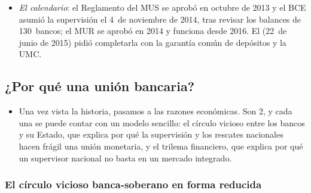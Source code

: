 \documentclass[11pt]{article}
\begin{document}
\begin{itemize}
\begin{itemize}
  \item un mes después, el «haré lo que sea necesario» de  (26~de julio) y las operaciones monetarias de compraventa (OMT) calmaron la deuda; la unión bancaria era la parte estructural de la respuesta\nocite{Draghi2012Speech,BCE2012OMT} .
  \end{itemize}
\item \emph{El calendario}: el Reglamento del MUS se aprobó en octubre de 2013 y el BCE asumió la supervisión el 4~de noviembre de 2014, tras revisar los balances de 130~bancos; el MUR se aprobó en 2014 y funciona desde 2016. El  (22~de junio de 2015) pidió completarla con la garantía común de depósitos y la UMC\nocite{RegUE2013MUS,RegUE2014MUR,Juncker2015CincoPresidentes}.
\end{itemize}

\begin{infografia}[H]
\centering
\caption{La unión bancaria y la Unión de Mercados de Capitales: cronología, 2009-2027}\label{figu:cronologia}
\end{infografia}

\subsection{¿Por qué una unión bancaria?}\label{sec:por-que}

\begin{itemize}
\item Una vez vista la historia, pasamos a las razones económicas. Son 2, y cada una se puede contar con un modelo sencillo: el círculo vicioso entre los bancos y su Estado, que explica por qué la supervisión y los rescates nacionales hacen frágil una unión monetaria, y el trilema financiero, que explica por qué un supervisor nacional no basta en un mercado integrado.
\end{itemize}

\subsubsection{El círculo vicioso banca-soberano en forma reducida}\label{sec:bucle}
\end{document}
